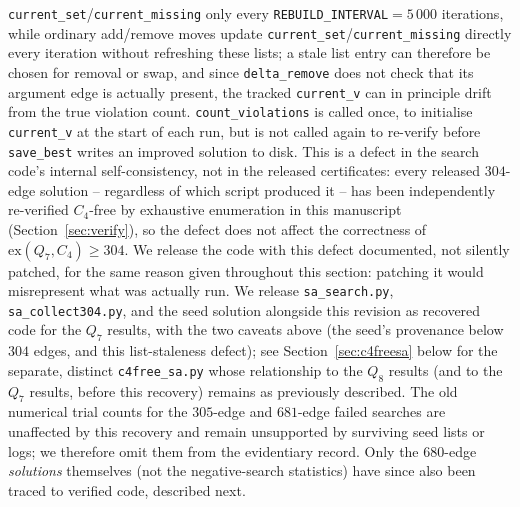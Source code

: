 \documentclass[12pt]{article}
\newcommand{\ex}{\mathrm{ex}}
\begin{document}
\texttt{current\_set}/\texttt{current\_missing} only every
\texttt{REBUILD\_INTERVAL}$=5\,000$ iterations, while ordinary
add/remove moves update \texttt{current\_set}/\texttt{current\_missing}
directly every iteration without refreshing these lists; a stale list
entry can therefore be chosen for removal or swap, and since
\texttt{delta\_remove} does not check that its argument edge is
actually present, the tracked \texttt{current\_v} can in principle
drift from the true violation count. \texttt{count\_violations} is
called once, to initialise \texttt{current\_v} at the start of each
run, but is not called again to re-verify before \texttt{save\_best}
writes an improved solution to disk. This is a defect in the search
code's internal self-consistency, not in the released certificates:
every released $304$-edge solution -- regardless of which script
produced it -- has been independently re-verified $C_4$-free by
exhaustive enumeration in this manuscript (Section~\ref{sec:verify}),
so the defect does not affect the correctness of
$\ex(Q_7,C_4)\ge304$. We release the code with this defect documented,
not silently patched, for the same reason given throughout this
section: patching it would misrepresent what was actually run. We
release \texttt{sa\_search.py}, \texttt{sa\_collect304.py}, and the
seed solution alongside this revision as recovered
code for the $Q_7$ results, with the two caveats above (the seed's
provenance below $304$ edges, and this list-staleness defect); see Section~\ref{sec:c4freesa} below for
the separate, distinct \texttt{c4free\_sa.py} whose relationship to
the $Q_8$ results (and to the $Q_7$ results, before this recovery)
remains as previously described. The old numerical trial counts for the $305$-edge and $681$-edge failed
searches are unaffected by this recovery and remain unsupported by surviving
seed lists or logs; we therefore omit them from the evidentiary record. Only
the $680$-edge \emph{solutions} themselves (not the negative-search
statistics) have since also been traced to verified code, described next.
\end{document}
